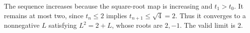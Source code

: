 The sequence increases because the square-root map is increasing and $t_1>t_0$. It remains at most two, since $t_n\le2$ implies $t_{n+1}\le\sqrt4=2$. Thus it converges to a nonnegative $L$ satisfying $L^2=2+L$, whose roots are $2,-1$. The valid limit is $\boxed2$.

